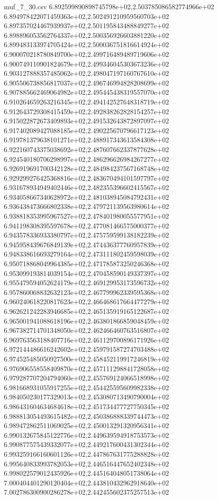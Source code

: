 \begin{filecontents*}{muf_7_30.csv}
6.892599890898745798e+02,2.503785086582774966e+02
6.894978422071459363e+02,2.502491210959560703e+02
6.897357024467939937e+02,2.501195843488849277e+02
6.898896053562764337e+02,2.500356926603881220e+02
6.899483133974705424e+02,2.500036751816614924e+02
6.900070218780849700e+02,2.499716489489719606e+02
6.900749110901824679e+02,2.499346045303673236e+02
6.903127888357485062e+02,2.498047197160767610e+02
6.905506738856817037e+02,2.496746994828208699e+02
6.907885662469064982e+02,2.495445438319557070e+02
6.910264659263216345e+02,2.494142527648318719e+02
6.912643729308415459e+02,2.492838262828154257e+02
6.915022872673409893e+02,2.491532643872897097e+02
6.917402089427088185e+02,2.490225670796617123e+02
6.919781379638101271e+02,2.488917343613584308e+02
6.922160743375038692e+02,2.487607662337877628e+02
6.924540180706298997e+02,2.486296626984267277e+02
6.926919691700342128e+02,2.484984237567168748e+02
6.929299276425368816e+02,2.483670494101597797e+02
6.931678934949402446e+02,2.482355396602415567e+02
6.934058667340628972e+02,2.481038945084792431e+02
6.936438473666802338e+02,2.479721139563980614e+02
6.938818353995967527e+02,2.478401980055577951e+02
6.941198308395597678e+02,2.477081466575000377e+02
6.943578336933380797e+02,2.475759599138182239e+02
6.945958439676849139e+02,2.474436377760957839e+02
6.948338616693279164e+02,2.473111802459598039e+02
6.950718868049964385e+02,2.471785873250246368e+02
6.953099193814039154e+02,2.470458590149337397e+02
6.955479594052624179e+02,2.469129953173596732e+02
6.957860068832632123e+02,2.467799962339595368e+02
6.960240618220817623e+02,2.466468617664477279e+02
6.962621242283946685e+02,2.465135919165122687e+02
6.965001941088618196e+02,2.463801866859048459e+02
6.967382714701348050e+02,2.462466460763516807e+02
6.969763563188407716e+02,2.461129700896171926e+02
6.972144486616242602e+02,2.459791587274703488e+02
6.974525485050927500e+02,2.458452119917246819e+02
6.976906558558409870e+02,2.457111298841728058e+02
6.979287707204794060e+02,2.455769124066518998e+02
6.981668931055917255e+02,2.454425595609982338e+02
6.984050230177329013e+02,2.453080713490790004e+02
6.986431604634684618e+02,2.451734477727750345e+02
6.988813054493615482e+02,2.450386888339744473e+02
6.989472862511069025e+02,2.450013291320956341e+02
6.990132675845122776e+02,2.449639594918753573e+02
6.990877575439332077e+02,2.449217600431302344e+02
6.993259166160601126e+02,2.447867631775288828e+02
6.995640833993782053e+02,2.446516447652402348e+02
6.998022579012435926e+02,2.445164048051738064e+02
7.000404401290120404e+02,2.443810432962918640e+02
7.002786300900286278e+02,2.442455602375257513e+02

\end{filecontents*}
